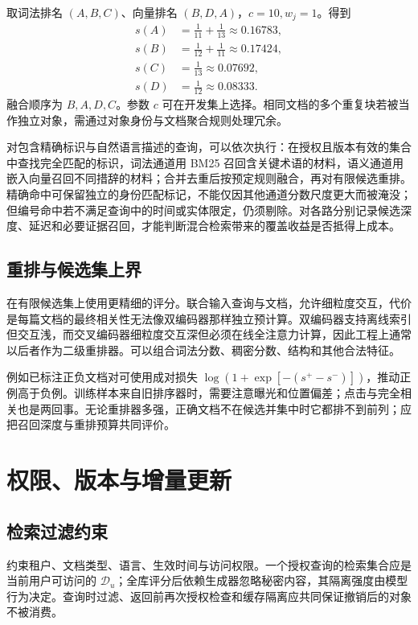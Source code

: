 \documentclass[../textbook.tex]{subfiles}
\begin{document}
取词法排名 $(A,B,C)$、向量排名 $(B,D,A)$，$c=10,w_j=1$。得到
\begin{align}
s(A) &= \frac{1}{11}+\frac{1}{13}\approx0.16783, \\
s(B) &= \frac{1}{12}+\frac{1}{11}\approx0.17424, \\
s(C) &= \frac{1}{13}\approx0.07692, \nonumber \\
s(D) &= \frac{1}{12}\approx0.08333.
\end{align}
融合顺序为 $B,A,D,C$。参数 $c$ 可在开发集上选择。相同文档的多个重复块若被当作独立对象，需通过对象身份与文档聚合规则处理冗余。

对包含精确标识与自然语言描述的查询，可以依次执行：在授权且版本有效的集合中查找完全匹配的标识，词法通道用 BM25 召回含关键术语的材料，语义通道用嵌入向量召回不同措辞的材料；合并去重后按预定规则融合，再对有限候选重排。精确命中可保留独立的身份匹配标记，不能仅因其他通道分数尺度更大而被淹没；但编号命中若不满足查询中的时间或实体限定，仍须剔除。对各路分别记录候选深度、延迟和必要证据召回，才能判断混合检索带来的覆盖收益是否抵得上成本。

\subsection{重排与候选集上界}
在有限候选集上使用更精细的评分。联合输入查询与文档，允许细粒度交互，代价是每篇文档的最终相关性无法像双编码器那样独立预计算。双编码器支持离线索引但交互浅，而交叉编码器细粒度交互深但必须在线全注意力计算，因此工程上通常以后者作为二级重排器。可以组合词法分数、稠密分数、结构和其他合法特征。

例如已标注正负文档对可使用成对损失 $\log(1+\exp[-(s^+-s^-)])$，推动正例高于负例。训练样本来自旧排序器时，需要注意曝光和位置偏差；点击与完全相关也是两回事。无论重排器多强，正确文档不在候选并集中时它都排不到前列；应把召回深度与重排预算共同评价。

\section{权限、版本与增量更新}

\subsection{检索过滤约束}
约束租户、文档类型、语言、生效时间与访问权限。一个授权查询的检索集合应是当前用户可访问的 $\mathcal D_u$；全库评分后依赖生成器忽略秘密内容，其隔离强度由模型行为决定。查询时过滤、返回前再次授权检查和缓存隔离应共同保证撤销后的对象不被消费。
\end{document}
